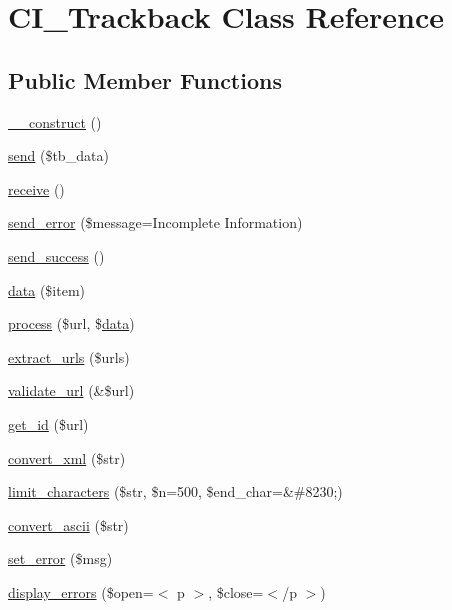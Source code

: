 \hypertarget{class_c_i___trackback}{}\section{C\+I\+\_\+\+Trackback Class Reference}
\label{class_c_i___trackback}
\subsection*{Public Member Functions}
\begin{DoxyCompactItemize}
\item 
\mbox{\hyperlink{class_c_i___trackback_a6a46599ac08641cbfc4f82156c47222a}{\+\_\+\+\_\+construct}} ()
\item 
\mbox{\hyperlink{class_c_i___trackback_a53a7142a0e7dd1ad08467f8320883cf9}{send}} (\$tb\+\_\+data)
\item 
\mbox{\hyperlink{class_c_i___trackback_a3959a94921442ab24dbe71696aceff16}{receive}} ()
\item 
\mbox{\hyperlink{class_c_i___trackback_af67e8ed261b4a2a3482a92ebaf67bb60}{send\+\_\+error}} (\$message=\textquotesingle{}Incomplete Information\textquotesingle{})
\item 
\mbox{\hyperlink{class_c_i___trackback_ae594681a931f07c1946663aaaf97e3f1}{send\+\_\+success}} ()
\item 
\mbox{\hyperlink{class_c_i___trackback_a8a11fd864ef076bc397847d3f6652934}{data}} (\$item)
\item 
\mbox{\hyperlink{class_c_i___trackback_a805b857928b44e18188cb51710d8a76c}{process}} (\$url, \$\mbox{\hyperlink{class_c_i___trackback_a8a11fd864ef076bc397847d3f6652934}{data}})
\item 
\mbox{\hyperlink{class_c_i___trackback_aed6543a51e490c9c6dbb982692f22ef1}{extract\+\_\+urls}} (\$urls)
\item 
\mbox{\hyperlink{class_c_i___trackback_af4935dcba4a24dcf78a7cd91ca686bbc}{validate\+\_\+url}} (\&\$url)
\item 
\mbox{\hyperlink{class_c_i___trackback_a92abcd341c9d8e143540d3d76a8a5ced}{get\+\_\+id}} (\$url)
\item 
\mbox{\hyperlink{class_c_i___trackback_a9863b761ea56c39b4ab729cb092126d9}{convert\+\_\+xml}} (\$str)
\item 
\mbox{\hyperlink{class_c_i___trackback_a515f9cb8b2ad73e74a8b3e37cc38061b}{limit\+\_\+characters}} (\$str, \$n=500, \$end\+\_\+char=\textquotesingle{}\&\#8230;\textquotesingle{})
\item 
\mbox{\hyperlink{class_c_i___trackback_a58749ae6b6bd5b00c22c15d2e5b2d8f9}{convert\+\_\+ascii}} (\$str)
\item 
\mbox{\hyperlink{class_c_i___trackback_a1d986be918a259c99a569d35f5a3d345}{set\+\_\+error}} (\$msg)
\item 
\mbox{\hyperlink{class_c_i___trackback_a88b31c54662c8de1bb9fd94357e0e557}{display\+\_\+errors}} (\$open=\textquotesingle{}$<$ p $>$\textquotesingle{}, \$close=\textquotesingle{}$<$/p $>$\textquotesingle{})
\end{DoxyCompactItemize}
